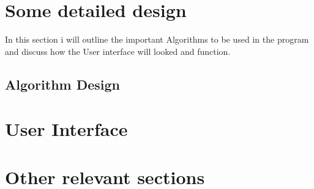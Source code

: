 \section{Some detailed design}
In this section i will outline the important Algorithms to be used in the program and discuss how the User interface will looked and function.
\subsection{Algorithm Design}
\section{User Interface}

\section{Other relevant sections}